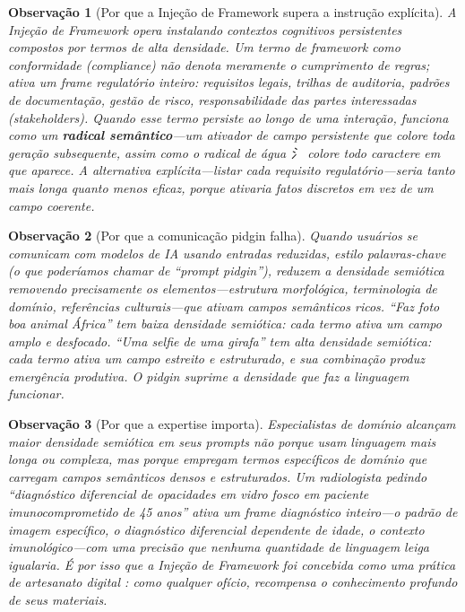 \documentclass[12pt,a4paper]{article}
\newcommand{\cjk}[1]{{\cjkfont #1}}
\newtheorem{observation}{Observação}[section]
\begin{document}
\begin{observation}[Por que a Injeção de Framework supera a instrução explícita]
\label{obs:fi}
A Injeção de Framework \cite{gomes2026founding} opera instalando contextos cognitivos persistentes compostos por termos de alta densidade.
Um termo de framework como \textit{conformidade} (\textit{compliance}) não denota meramente o cumprimento de regras; ativa um \textit{frame} regulatório inteiro: requisitos legais, trilhas de auditoria, padrões de documentação, gestão de risco, responsabilidade das partes interessadas (\textit{stakeholders}).
Quando esse termo persiste ao longo de uma interação, funciona como um \textbf{radical semântico}---um ativador de campo persistente que colore toda geração subsequente, assim como o radical de água \cjk{氵} colore todo caractere em que aparece.
A alternativa explícita---listar cada requisito regulatório---seria tanto mais longa quanto menos eficaz, porque ativaria fatos discretos em vez de um campo coerente.
\end{observation}

\begin{observation}[Por que a comunicação pidgin falha]
\label{obs:pidgin}
Quando usuários se comunicam com modelos de IA usando entradas reduzidas, estilo palavras-chave (o que poderíamos chamar de ``prompt pidgin''), reduzem a densidade semiótica removendo precisamente os elementos---estrutura morfológica, terminologia de domínio, referências culturais---que ativam campos semânticos ricos.
``Faz foto boa animal África'' tem baixa densidade semiótica: cada termo ativa um campo amplo e desfocado.
``Uma selfie de uma girafa'' tem alta densidade semiótica: cada termo ativa um campo estreito e estruturado, e sua combinação produz emergência produtiva.
O pidgin suprime a densidade que faz a linguagem funcionar.
\end{observation}

\begin{observation}[Por que a expertise importa]
\label{obs:expertise}
Especialistas de domínio alcançam maior densidade semiótica em seus prompts não porque usam linguagem mais longa ou complexa, mas porque empregam termos específicos de domínio que carregam campos semânticos densos e estruturados.
Um radiologista pedindo ``diagnóstico diferencial de opacidades em vidro fosco em paciente imunocomprometido de 45 anos'' ativa um \textit{frame} diagnóstico inteiro---o padrão de imagem específico, o diagnóstico diferencial dependente de idade, o contexto imunológico---com uma precisão que nenhuma quantidade de linguagem leiga igualaria.
É por isso que a Injeção de Framework foi concebida como uma prática de \textit{artesanato digital} \cite{gomes2026founding}: como qualquer ofício, recompensa o conhecimento profundo de seus materiais.
\end{observation}
\end{document}
